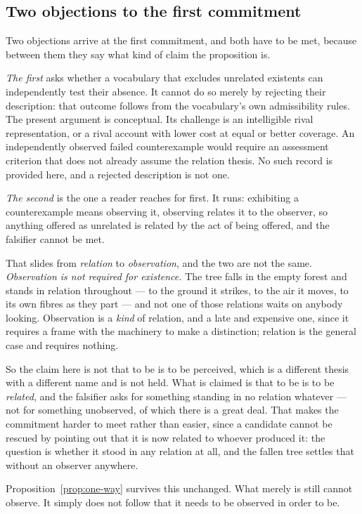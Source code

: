 \documentclass[11pt,a4paper]{article}
\theoremstyle{remark}\newtheorem{remark}[proposition]{Remark}
\begin{document}
\subsection*{Two objections to the first commitment}
Two objections arrive at the first commitment, and both have to be met, because between them they say
what kind of claim the proposition is.

\emph{The first} asks whether a vocabulary that excludes unrelated existents
can independently test their absence. It cannot do so merely by rejecting their
description: that outcome follows from the vocabulary's own admissibility rules.
The present argument is conceptual. Its challenge is an intelligible rival
representation, or a rival account with lower cost at equal or better coverage.
An independently observed failed counterexample would require an assessment
criterion that does not already assume the relation thesis. No such record is
provided here, and a rejected description is not one.

\emph{The second} is the one a reader reaches for first. It runs: exhibiting a counterexample means
observing it, observing relates it to the observer, so anything offered as unrelated is related by the
act of being offered, and the falsifier cannot be met.

That slides from \emph{relation} to \emph{observation}, and the two are not the same. \emph{Observation
is not required for existence.} The tree falls in the empty forest and stands in relation throughout ---
to the ground it strikes, to the air it moves, to its own fibres as they part --- and not one of those
relations waits on anybody looking. Observation is a \emph{kind} of relation, and a late and expensive
one, since it requires a frame with the machinery to make a distinction; relation is the general case
and requires nothing.

So the claim here is not that to be is to be perceived, which is a different thesis with a different
name and is not held. What is claimed is that to be is to be \emph{related}, and the falsifier asks for
something standing in no relation whatever --- not for something unobserved, of which there is a great
deal. That makes the commitment harder to meet rather than easier, since a candidate cannot be rescued
by pointing out that it is now related to whoever produced it: the question is whether it stood in any
relation at all, and the fallen tree settles that without an observer anywhere.

Proposition~\ref{prop:one-way} survives this unchanged. What merely is still cannot observe. It simply
does not follow that it needs to be observed in order to be.
\end{document}
